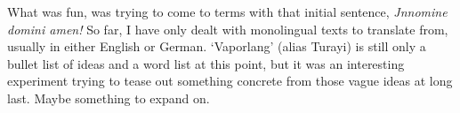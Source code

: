 \documentclass[12pt,paper=a4]{scrartcl}
\newcommand{\fw}[1]{\textit{#1}} %
\begin{document}
What was fun, was trying to come to terms with that initial sentence, 
\fw{Jnn\emph{omin}e d\emph{omi}n\emph{i} am\emph{en}!} So far, I have only dealt 
with monolingual texts to translate from, usually in either English or German. 
\enquote*{Vaporlang} (alias Turayi) is still only a bullet list of ideas and a 
word list at this point, but it was an interesting experiment trying to tease 
out something concrete from those vague ideas at long last. Maybe something to 
expand on.


\pagebreak

\printglossary[style=mysuper,type=\leipzigtype]

\printbibliography[heading=bibintoc]
\end{document}
